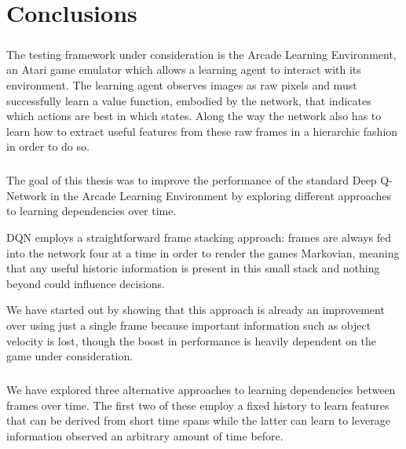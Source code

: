 \chapter{Conclusions}

\paragraph{}
The testing framework under consideration
is the Arcade Learning Environment,
an Atari game emulator
which allows a learning agent to interact
with its environment.
The learning agent observes images as raw pixels
and must successfully learn a value function,
embodied by the network,
that indicates which actions are best in which states.
Along the way the network also has to learn
how to extract useful features
from these raw frames
in a hierarchic fashion
in order to do so.

\paragraph{}
The goal of this thesis was to improve the performance
of the standard Deep Q-Network
in the Arcade Learning Environment
by exploring different approaches
to learning dependencies over time.

DQN employs a straightforward frame stacking approach:
frames are always fed into the network
four at a time
in order to render the games Markovian,
meaning that any useful historic information
is present in this small stack
and nothing beyond could influence decisions.

We have started out by showing that this approach
is already an improvement over
using just a single frame
because important information such as object velocity is lost,
though the boost in performance is heavily dependent
on the game under consideration.

\paragraph{}
We have explored three alternative approaches
to learning dependencies between frames over time.
The first two of these employ a fixed history
to learn features that can be derived from short time spans
while the latter can learn to leverage information
observed an arbitrary amount of time before.

